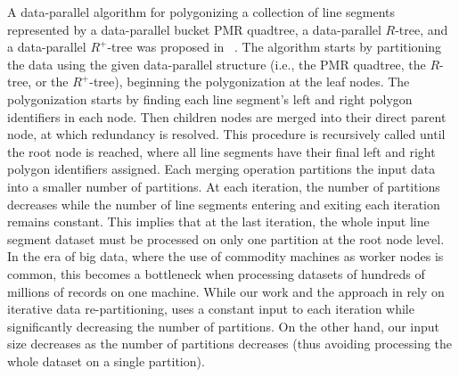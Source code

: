 A data-parallel algorithm for polygonizing a collection of line segments represented by a data-parallel bucket PMR quadtree, a data-parallel $R$-tree, and a data-parallel $R^+$-tree was proposed in ~\cite{HS03}. 
The algorithm starts by partitioning the data using the given data-parallel structure (i.e., the PMR quadtree, the $R$-tree, or the $R^+$-tree), beginning the polygonization at the leaf nodes. 
The polygonization starts by finding each line segment's left and right polygon identifiers in each node. Then children nodes are merged into their direct parent node, at which redundancy is resolved. This procedure is recursively called until the root node is reached, where all line segments have their final left and right polygon identifiers assigned. 
Each merging operation partitions the input data into a smaller number of partitions. At each iteration, the number of partitions decreases while the number of line segments entering and exiting each iteration remains constant.
This implies that at the last iteration, the whole input line segment dataset must be processed on only one partition at the root node level.
In the era of big data, where the use of commodity machines as worker nodes is common, this becomes a bottleneck when processing datasets of hundreds of millions of records on one machine.
While our work and the approach in \cite{HS03} rely on iterative data re-partitioning, \cite{HS03} uses a constant input to each iteration while significantly decreasing the number of partitions.
On the other hand, our input size decreases as the number of partitions decreases (thus avoiding processing the whole dataset on a single partition).


